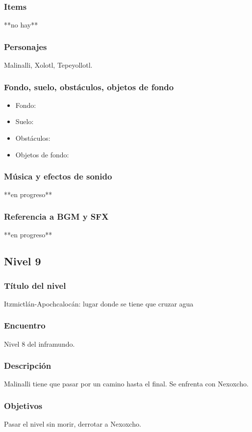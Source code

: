 \documentclass[11pt,letterpaper]{article}
\begin{document}
	\subsubsection{Items}
	**no hay**
	\subsubsection{Personajes}
	Malinalli, Xolotl, Tepeyollotl.
	\subsubsection{Fondo, suelo, obstáculos, objetos de fondo}
\begin{itemize} 
	\item Fondo:
	\item Suelo:
	\item Obstáculos:
	\item Objetos de fondo:
\end{itemize}	
	\subsubsection{Música y efectos de sonido}
	**en progreso**
	\subsubsection{Referencia a BGM y SFX}
	**en progreso**
	
		\subsection{Nivel 9}
	\subsubsection{Título del nivel}
	Itzmictlán-Apochcalocán: lugar donde se tiene que cruzar agua
	\subsubsection{Encuentro}
	Nivel 8 del inframundo.
	\subsubsection{Descripción}
	Malinalli tiene que pasar por un camino hasta el final. Se enfrenta con Nexoxcho.
	\subsubsection{Objetivos}
	Pasar el nivel  sin morir, derrotar a Nexoxcho.
\end{document}
